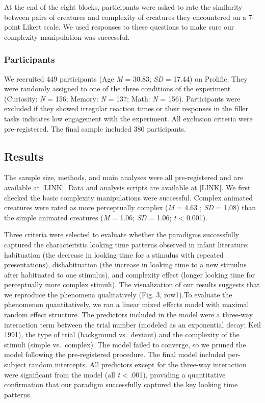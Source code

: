 \documentclass[10pt, letterpaper]{article}
\begin{document}
At the end of the eight blocks, participants were asked to rate the
similarity between pairs of creatures and complexity of creatures they
encountered on a 7-point Likert scale. We used responses to these
questions to make sure our complexity manipulation was successful.

\hypertarget{participants}{%
\subsubsection{Participants}\label{participants}}

We recruited 449 participants (Age \emph{M} = 30.83; \emph{SD} = 17.44)
on Prolific. They were randomly assigned to one of the three conditions
of the experiment (Curiosity: \emph{N} = 156; Memory: \emph{N} = 137;
Math: \emph{N} = 156). Participants were excluded if they showed
irregular reaction times or their responses in the filler tasks
indicates low engagement with the experiment. All exclusion criteria
were pre-registered. The final sample included 380 participants.

\hypertarget{results}{%
\subsection{Results}\label{results}}

The sample size, methods, and main analyses were all pre-registered and
are available at {[}LINK{]}. Data and analysis scripts are available at
{[}LINK{]}. We first checked the basic complexity manipulations were
successful. Complex animated creatures were rated as more perceptually
complex (\emph{M} = 4.63 ; \emph{SD} = 1.08) than the simple animated
creatures (\emph{M} = 1.06; \emph{SD} = 1.06; \emph{t} \textless{}
0.001).

Three criteria were selected to evaluate whether the paradigms
successfully captured the characteristic looking time patterns observed
in infant literature: habituation (the decrease in looking time for a
stimulus with repeated presentations), dishabituation (the increase in
looking time to a new stimulus after habituated to one stimulus), and
complexity effect (longer looking time for perceptually more complex
stimuli). The visualization of our results suggests that we reproduce
the phenomena qualitatively (Fig. 3, row1).To evaluate the phenomenon
quantitatively, we ran a linear mixed effects model with maximal random
effect structure. The predictors included in the model were a three-way
interaction term between the trial number (modeled as an exponential
decay; Keil 1991), the type of trial (background vs.~deviant) and the
complexity of the stimuli (simple vs.~complex). The model failed to
converge, so we pruned the model following the pre-registered procedure.
The final model included per-subject random intercepts. All predictors
except for the three-way interaction were significant from the model
(all \emph{t} \textless{} .001), providing a quantitative confirmation
that our paradigm successfully captured the key looking time patterns.
\end{document}
